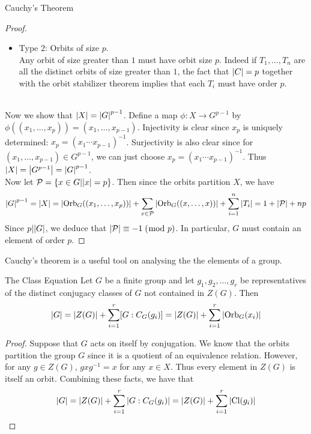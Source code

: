 \documentclass[a4paper]{article}
\begin{document}
\begin{thm}{Cauchy's Theorem}{}
\begin{proof}
\begin{itemize}
In fact, every orbit of size $1$ must be one of the above two cases. Suppose that $S$ is an orbit of size $1$. Let $(x_1,\dots,x_p)\in X$. Then the orbit stabilizer theorem implies that $\text{Stab}_C((x_1,\dots,x_p))=C$. Since $f=(1,\dots,p)\in C$, we have 
\begin{align*}
(x_1,\dots,x_p)&=f\cdot(x_1,\dots,x_p)\tag{$f\in\text{Stab}_C((x_1,\dots,x_p))$}\\
&=(x_2,\dots,x_p,x_1)
\end{align*} which means that $x_1=\dots=x_p$. This means that $x_1^p=1$. Since $p$ is a prime this means that $\abs{x_1}=1$ or $p$. In which either way it falls into one of the two above cases. 
\item Type 2: Orbits of size $p$. \\
Any orbit of size greater than $1$ must have orbit size $p$. Indeed if $T_1,\dots,T_n$ are all the distinct orbits of size greater than $1$, the fact that $\abs{C}=p$ together with the orbit stabilizer theorem implies that each $T_i$ must have order $p$. 
\end{itemize}~\\
Now we show that $\abs{X}=\abs{G}^{p-1}$. Define a map $\phi:X\to G^{p-1}$ by $\phi((x_1,\dots,x_p))=(x_1,\dots,x_{p-1})$. Injectivity is clear since $x_p$ is uniquely determined: $x_p=(x_1\cdots x_{p-1})^{-1}$. Surjectivity is also clear since for $(x_1,\dots,x_{p-1})\in G^{p-1}$, we can just choose $x_p=(x_1\cdots x_{p-1})^{-1}$. Thus $\abs{X}=\abs{G^{p-1}}=\abs{G}^{p-1}$. \\

Now let $\mathcal{P}=\{x\in G|\abs{x}=p\}$. Then since the orbits partition $X$, we have $$\abs{G}^{p-1}=\abs{X}=\abs{\text{Orb}_G((x_1,\dots,x_p))}+\sum_{x\in\mathcal{P}}\abs{\text{Orb}_G((x,\dots,x))}+\sum_{i=1}^n\abs{T_i}=1+\abs{\mathcal{P}}+np$$ Since $p|\abs{G}$, we deduce that $\abs{\mathcal{P}}\equiv-1\;(\bmod\;p)$. In particular, $G$ must contain an element of order $p$. 
\end{proof}
\end{thm}

Cauchy's theorem is a useful tool on analysing the the elements of a group. 

\begin{thm}{The Class Equation}{} Let $G$ be a finite group and let $g_1,g_2,\dots,g_r$ be representatives of the distinct conjugacy classes of $G$ not contained in $Z(G)$. Then $$\abs{G}=\abs{Z(G)}+\sum_{i=1}^r[G:C_G(g_i)]=\abs{Z(G)}+\sum_{i=1}^r\abs{\text{Orb}_G(x_i)}$$ 
\begin{proof}
Suppose that $G$ acts on itself by conjugation. We know that the orbits partition the group $G$ since it is a quotient of an equivalence relation. However, for any $g\in Z(G)$, $gxg^{-1}=x$ for any $x\in X$. Thus every element in $Z(G)$ is itself an orbit. Combining these facts, we have that $$\abs{G}=\abs{Z(G)}+\sum_{i=1}^r\abs{G:C_G(g_i)}=\abs{Z(G)}+\sum_{i=1}^r\abs{\text{Cl}(g_i)}$$
\end{proof}
\end{thm}
\end{document}
